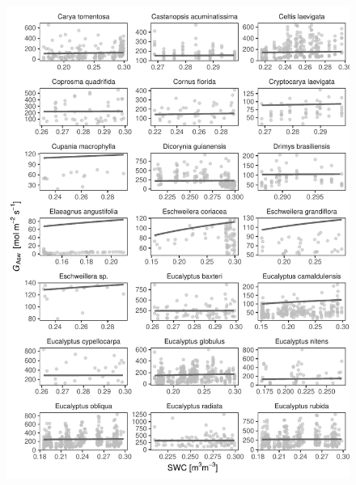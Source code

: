 \documentclass[11pt,twoside]{reedthesis}
\begin{document}
\begin{figure}[H]

{\centering \includegraphics[width=1\linewidth]{figure/appendixD/ggg10} 

}

\end{figure}
\end{document}

